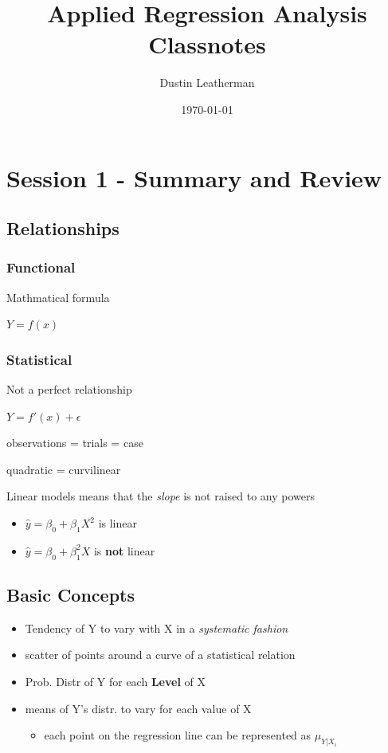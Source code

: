 \documentclass[11pt]{article}
\author{Dustin Leatherman}
\date{\today}
\title{Applied Regression Analysis Classnotes}
\begin{document}
\maketitle
\tableofcontents


\section{Session 1 - Summary and Review}
\label{sec:orgf9c98a2}
\subsection{Relationships}
\label{sec:org9dee715}
\subsubsection{Functional}
\label{sec:orgb8a9e8e}
Mathmatical formula

\(Y = f(x)\)
\subsubsection{Statistical}
\label{sec:org1c8affd}
Not a perfect relationship

\(Y = f'(x) + \epsilon\)

observations = trials = case

quadratic = curvilinear

Linear models means that the \emph{slope} is not raised to any powers
\begin{itemize}
\item \(\hat{y} = \beta_0 + \beta_1 X^2\) is linear
\item \(\hat{y} = \beta_0 + \beta_1^2 X\) is \textbf{not} linear
\end{itemize}

\subsection{Basic Concepts}
\label{sec:org8dc78cd}
\begin{itemize}
\item Tendency of Y to vary with X in a \emph{systematic fashion}
\item scatter of points around a curve of a statistical relation
\item Prob. Distr of Y for each \textbf{Level} of X
\item means of Y's distr. to vary for each value of X
\begin{itemize}
\item each point on the regression line can be represented as \(\mu_{Y|X_i}\)
\end{itemize}
\end{itemize}
\end{document}
